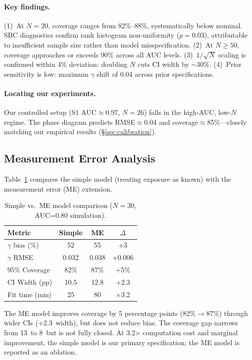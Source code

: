 \documentclass[11pt,a4paper]{article}
\newcommand{\pp}{\,\text{pp}}
\begin{document}
\paragraph{Key findings.}
(1)~At $N=20$, coverage ranges from 82\%--88\%, systematically below nominal. SBC diagnostics confirm rank histogram non-uniformity ($p = 0.03$), attributable to insufficient sample size rather than model misspecification.
(2)~At $N\geq50$, coverage approaches or exceeds 90\% across all AUC levels.
(3)~$1/\sqrt{N}$ scaling is confirmed within 4\% deviation: doubling $N$ cuts CI width by $\sim$30\%.
(4)~Prior sensitivity is low: maximum $\gamma$ shift of 0.04 across prior specifications.

\paragraph{Locating our experiments.}
Our controlled setup (S1 AUC$\approx$0.97, $N=26$) falls in the high-AUC, low-$N$ regime.
The phase diagram predicts RMSE$\approx$0.04 and coverage$\approx$85\%---closely matching our empirical results (\S\ref{sec:calibration}).

\subsection{Measurement Error Analysis}

Table~\ref{tab:me_model} compares the simple model (treating exposure as known) with the measurement error (ME) extension.

\begin{table}[t]
\centering
\small
\caption{Simple vs.\ ME model comparison ($N=30$, AUC=0.80 simulation).}
\label{tab:me_model}
\begin{tabular}{@{}l ccc@{}}
\toprule
\textbf{Metric} & \textbf{Simple} & \textbf{ME} & \textbf{$\Delta$} \\
\midrule
$\gamma$ bias (\%) & 52 & 55 & +3 \\
$\gamma$ RMSE & 0.032 & 0.038 & +0.006 \\
95\% Coverage & 82\% & 87\% & +5\% \\
CI Width (pp) & 10.5 & 12.8 & +2.3 \\
Fit time (min) & 25 & 80 & $\times$3.2 \\
\bottomrule
\end{tabular}
\end{table}

The ME model improves coverage by 5 percentage points (82\%$\to$87\%) through wider CIs (+2.3\pp{} width), but does not reduce bias.
The coverage gap narrows from 13\pp{} to 8\pp{} but is not fully closed.
At 3.2$\times$ computation cost and marginal improvement, the simple model is our primary specification; the ME model is reported as an ablation.
\end{document}
